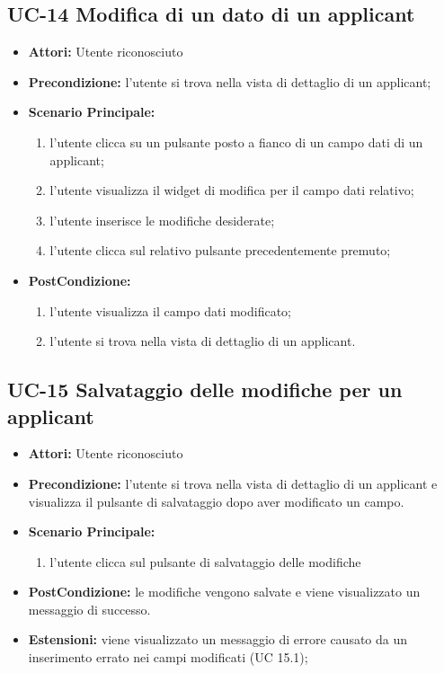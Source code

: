 \subsection{UC-14 Modifica di un dato di un applicant}
\begin{itemize}
\item \textbf{Attori:} Utente riconosciuto
\item \textbf{Precondizione:}  l'utente si trova nella vista di dettaglio di un applicant;
\item \textbf{Scenario Principale:}
\begin{enumerate}
	\item l'utente clicca su un pulsante posto a fianco di un campo dati di un applicant;
	\item l'utente visualizza il  widget di modifica per il campo dati
	relativo;
	\item l'utente inserisce le modifiche desiderate;
	\item l'utente clicca sul relativo pulsante precedentemente premuto;
\end{enumerate}
\item \textbf{PostCondizione:} 
\begin{enumerate}
	\item l'utente visualizza il campo dati modificato;
	\item l'utente si trova nella vista di dettaglio di un applicant.
\end{enumerate}

\end{itemize}


\subsection{UC-15 Salvataggio delle modifiche per un applicant}
\begin{itemize}
\item \textbf{Attori:} Utente riconosciuto
\item \textbf{Precondizione:} l'utente si trova nella vista di dettaglio di un applicant e visualizza il pulsante di salvataggio dopo aver modificato un campo.
\item \textbf{Scenario Principale:}
\begin{enumerate}
	\item l'utente clicca sul pulsante di salvataggio delle modifiche 
\end{enumerate}
\item \textbf{PostCondizione:} le modifiche vengono salvate e viene visualizzato un messaggio di successo.
\item \textbf{Estensioni:} viene visualizzato un messaggio di errore causato da un inserimento errato nei campi modificati (UC 15.1);
\end{itemize}



